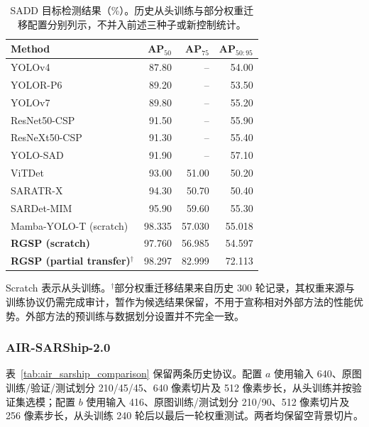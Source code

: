 \documentclass[journal]{IEEEtran}
\begin{document}
\begin{table}[!t]
\centering
\small
\setlength{\tabcolsep}{5pt}
\caption{SADD 目标检测结果（\%）。历史从头训练与部分权重迁移配置分别列示，不并入前述三种子或新控制统计。}
\label{tab:sadd_comparison}
\begin{tabular*}{\textwidth}{@{\extracolsep{\fill}}lrrr}
\toprule
Method & AP$_{50}$ & AP$_{75}$ & AP$_{50:95}$ \\
\midrule
YOLOv4         & 87.80 & -- & 54.00 \\
YOLOR-P6       & 89.20 & -- & 53.50 \\
YOLOv7         & 89.80 & -- & 55.20 \\
ResNet50-CSP   & 91.50 & -- & 55.90 \\
ResNeXt50-CSP  & 91.30 & -- & 55.40 \\
YOLO-SAD       & 91.90 & -- & 57.10 \\
ViTDet         & 93.00 & 51.00 & 50.20 \\
SARATR-X       & 94.30 & 50.70 & 50.40 \\
SARDet-MIM     & 95.90 & 59.60 & 55.30 \\
\midrule
Mamba-YOLO-T (scratch)
               & 98.335 & 57.030 & 55.018 \\
\textbf{RGSP (scratch)}
               & 97.760 & 56.985 & 54.597 \\
\textbf{RGSP (partial transfer)}$^{\dagger}$
               & 98.297 & 82.999 & 72.113 \\
\bottomrule
\end{tabular*}
\smallskip
\begin{minipage}{\linewidth}
\footnotesize
Scratch 表示从头训练。$^{\dagger}$部分权重迁移结果来自历史 300 轮记录，其权重来源与训练协议仍需完成审计，暂作为候选结果保留，不用于宣称相对外部方法的性能优势。外部方法的预训练与数据划分设置并不完全一致。
\end{minipage}
\end{table}

\subsubsection{AIR-SARShip-2.0}
\label{sec:air_sarship_results}

表~\ref{tab:air_sarship_comparison} 保留两条历史协议。配置 $a$ 使用输入 640、原图训练/验证/测试划分 210/45/45、640 像素切片及 512 像素步长，从头训练并按验证集选模；配置 $b$ 使用输入 416、原图训练/测试划分 210/90、512 像素切片及 256 像素步长，从头训练 240 轮后以最后一轮权重测试。两者均保留空背景切片。
\end{document}
